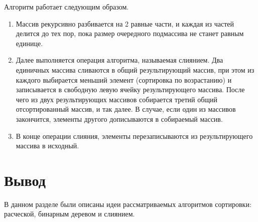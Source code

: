 Алгоритм работает следующим образом.
\begin{enumerate}[label=\arabic*)]
	\item Массив рекурсивно разбивается на 2 равные части, и каждая из частей делится до тех пор, пока размер очередного подмассива не станет равным единице.	
	\item Далее выполняется операция алгоритма, называемая слиянием. Два единичных массива сливаются в общий результирующий массив, при этом из каждого выбирается меньший элемент (сортировка по возрастанию) и записывается в свободную левую ячейку результирующего массива. После чего из двух результирующих массивов собирается третий общий отсортированный массив, и так далее. В случае, если один из массивов закончится, элементы другого дописываются в собираемый массив.	
	\item В конце операции слияния, элементы перезаписываются из результирующего массива в исходный.
\end{enumerate}


\section*{Вывод}
В данном разделе были описаны идеи рассматриваемых алгоритмов сортировки: расческой, бинарным деревом и слиянием.
